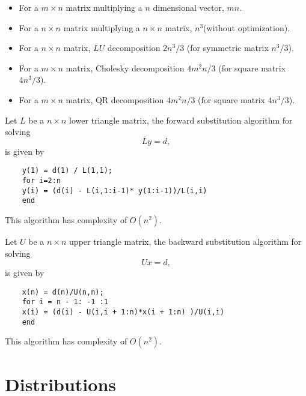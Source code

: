 \begin{refsection}
\begin{note}\cite[606]{nocedal2006numerical}
	\begin{itemize}
		\item For a $m\times n$ matrix multiplying a $n$ dimensional vector, $mn$.
		\item For a $n\times n$ matrix multiplying a $n\times n$ matrix, $n^3$(without optimization).
		\item For a $n\times n$ matrix, $LU$ decomposition $2n^3/3$ (for symmetric matrix $n^3/3$).
		\item For a $m\times n$ matrix, Cholesky decomposition $4m^2n/3$ (for square matrix $4n^3/3$).
		\item For a $m\times n$ matrix, QR decomposition $4m^2n/3$ (for square matrix $4n^3/3$).
	\end{itemize}	
\end{note}


\begin{note}
	Let $L$ be a $n\times n$ lower triangle matrix, the forward substitution algorithm for solving
	$$Ly = d,$$
	is given by
	\begin{verbatim}
	y(1) = d(1) / L(1,1);
	for i=2:n
	y(i) = (d(i) - L(i,1:i-1)* y(1:i-1))/L(i,i)
	end
	\end{verbatim}
	This algorithm has complexity of $O(n^2)$.
	
	
	Let $U$ be a $n\times n$ upper triangle matrix, the backward substitution algorithm for solving
	$$Ux = d,$$
	is given by
	\begin{verbatim}
	x(n) = d(n)/U(n,n);
	for i = n - 1: -1 :1
	x(i) = (d(i) - U(i,i + 1:n)*x(i + 1:n) )/U(i,i)
	end
	\end{verbatim}
	This algorithm has complexity of $O(n^2)$.	
\end{note}


\section{Distributions}


\end{refsection}
